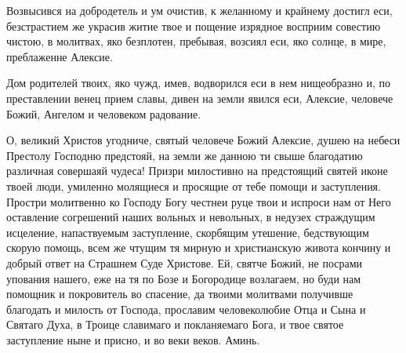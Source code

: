 \mychapterending


\begin{mymulticols}




Возвысився на добродетель и ум очистив, к желанному и крайнему достигл еси, безстрастием же украсив житие твое и пощение изрядное восприим совестию чистою, в молитвах, яко безплотен, пребывая, возсиял еси, яко солнце, в мире, преблаженне Алексие.




Дом родителей твоих, яко чужд, имев, водворился еси в нем нищеобразно и, по преставлении венец прием славы, дивен на земли явился еси, Алексие, человече Божий, Ангелом и человеком радование.




О, великий Христов угодниче, святый человече Божий Алексие, душею на небеси Престолу Господню предстояй, на земли же данною ти свыше благодатию различная совершаяй чудеса! Призри милостивно на предстоящий святей иконе твоей люди, умиленно молящиеся и просящие от тебе помощи и заступления. Простри молитвенно ко Господу Богу честнеи руце твои и испроси нам от Него оставление согрешений наших вольных и невольных, в недузех страждущим исцеление, напаствуемым заступление, скорбящим утешение, бедствующим скорую помощь, всем же чтущим тя мирную и христианскую живота кончину и добрый ответ на Страшнем Суде Христове. Ей, святче Божий, не посрами упования нашего, еже на тя по Бозе и Богородице возлагаем, но буди нам помощник и покровитель во спасение, да твоими молитвами получивше благодать и милость от Господа, прославим человеколюбие Отца и Сына и Святаго Духа, в Троице славимаго и покланяемаго Бога, и твое святое заступление ныне и присно, и во веки веков. Аминь.

\end{mymulticols}

\mychapterending{}



\vspace{-\baselineskip}

